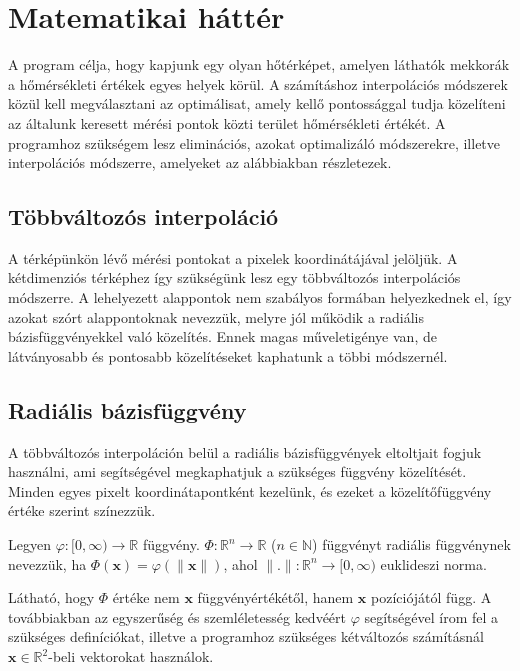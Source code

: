 	
	\chapter{Matematikai háttér}
	
	
	A program célja, hogy kapjunk egy olyan hőtérképet, amelyen láthatók mekkorák a hőmérsékleti értékek egyes helyek körül. A számításhoz interpolációs módszerek közül kell megválasztani az optimálisat, amely kellő pontossággal tudja közelíteni az általunk keresett mérési pontok közti terület hőmérsékleti értékét. A programhoz szükségem lesz eliminációs, azokat optimalizáló módszerekre, illetve interpolációs módszerre, amelyeket az alábbiakban részletezek.
		
		\section{Többváltozós interpoláció}
		
		A térképünkön lévő mérési pontokat a pixelek koordinátájával jelöljük. A kétdimenziós térképhez így szükségünk lesz egy többváltozós interpolációs módszerre. A lehelyezett alappontok nem szabályos formában helyezkednek el, így azokat szórt alappontoknak nevezzük, melyre jól működik a radiális bázisfüggvényekkel való közelítés. Ennek magas műveletigénye van, de látványosabb és pontosabb közelítéseket kaphatunk a többi módszernél.
		
		\section{Radiális bázisfüggvény}\label{subsec:num1}
		
		A többváltozós interpoláción belül a radiális bázisfüggvények eltoltjait fogjuk használni, ami segítségével megkaphatjuk a szükséges függvény közelítését. Minden egyes pixelt koordinátapontként kezelünk, és ezeket a közelítőfüggvény értéke szerint színezzük.
		
		\begin{defi} 
			Legyen $\varphi : [0,\infty) \to \mathbb{R}$ függvény.  $\Phi: \mathbb{R}^n \to \mathbb{R}$ ($n \in \mathbb{N}$) függvényt radiális függvénynek nevezzük, ha $\Phi(\mathbf{x}) = \varphi(\|\mathbf{x}\|)$, ahol $\|.\|:\mathbb{R}^n \to [0, \infty)$ euklideszi norma.
		\end{defi}	%
		Látható, hogy $\Phi$ értéke nem $\mathbf{x}$ függvényértékétől, hanem $\mathbf{x}$ pozíciójától függ. A továbbiakban az egyszerűség és szemléletesség kedvéért $\varphi$ segítségével írom fel a szükséges definíciókat, illetve a programhoz szükséges kétváltozós számításnál $\mathbf{x} \in \mathbb{R}^2$-beli vektorokat használok. 
		
